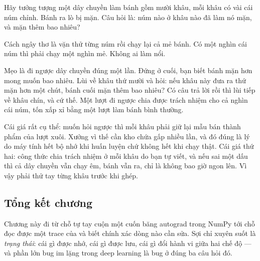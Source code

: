 \documentclass[../../deep_learning.tex]{subfiles}
\begin{document}
\begin{dongian}
Hãy tưởng tượng một dây chuyền làm bánh gồm mười khâu, mỗi khâu có vài cái núm chỉnh. Bánh ra lò bị mặn. Câu hỏi là: núm nào ở khâu nào đã làm nó mặn, và mặn thêm bao nhiêu?

Cách ngây thơ là vặn thử từng núm rồi chạy lại cả mẻ bánh. Có một nghìn cái núm thì phải chạy một nghìn mẻ. Không ai làm nổi.

Mẹo là đi ngược dây chuyền đúng một lần. Đứng ở cuối, bạn biết bánh mặn hơn mong muốn bao nhiêu. Lùi về khâu thứ mười và hỏi: nếu khâu này đưa ra thứ mặn hơn một chút, bánh cuối mặn thêm bao nhiêu? Có câu trả lời rồi thì lùi tiếp về khâu chín, và cứ thế. Một lượt đi ngược chia được trách nhiệm cho cả nghìn cái núm, tốn xấp xỉ bằng một lượt làm bánh bình thường.

Cái giá rất cụ thể: muốn hỏi ngược thì mỗi khâu phải giữ lại mẫu bán thành phẩm của lượt xuôi. Xưởng vì thế cần kho chứa gấp nhiều lần, và đó đúng là lý do máy tính hết bộ nhớ khi huấn luyện chứ không hết khi chạy thật. Cái giá thứ hai: công thức chia trách nhiệm ở mỗi khâu do bạn tự viết, và nếu sai một dấu thì cả dây chuyền vẫn chạy êm, bánh vẫn ra, chỉ là không bao giờ ngon lên. Vì vậy phải thử tay từng khâu trước khi ghép.

\end{dongian}

\subsection*{Tổng kết chương}
Chương này đi từ chỗ tự tay cuộn một cuốn băng autograd trong NumPy tới chỗ đọc được một trace của  và biết chính xác dòng nào cần sửa. Sợi chỉ xuyên suốt là \emph{trạng thái}: cái gì được nhớ, cái gì được lưu, cái gì đổi hành vi giữa hai chế độ --- và phần lớn bug im lặng trong deep learning là bug ở đúng ba câu hỏi đó.
\end{document}
